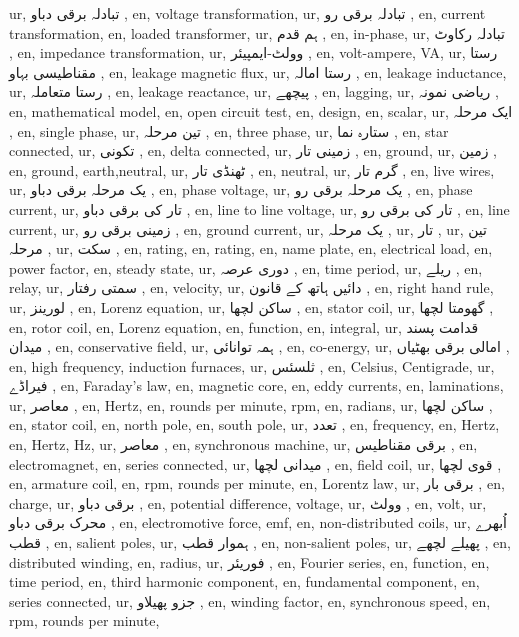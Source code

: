 ur, تبادلہ برقی دباو ,
en, voltage transformation,
ur, تبادلہ برقی رو ,
en, current transformation,
en, loaded transformer,
ur, ہم قدم ,
en, in-phase,
ur, تبادلہ رکاوٹ ,
en, impedance transformation,
ur, وولٹ-ایمپیئر ,
en, volt-ampere, VA,
ur, رستا مقناطیسی بہاو ,
en, leakage magnetic flux,
ur, رستا امالہ ,
en, leakage inductance,
ur, رستا متعاملہ ,
en, leakage reactance,
ur, پیچھے ,
en, lagging,
ur, ریاضی نمونہ ,
en, mathematical model,
en, open circuit test,
en, design,
en, scalar,
ur, ایک مرحلہ ,
en, single phase,
ur, تین مرحلہ ,
en, three phase,
ur, ستارہ نما ,
en, star connected,
ur, تکونی ,
en, delta connected,
ur, زمینی تار ,
en, ground,
ur, زمین ,
en, ground, earth,neutral,
ur, ٹھنڈی تار ,
en, neutral,
ur, گرم تار ,
en, live wires,
ur, یک مرحلہ برقی دباو ,
en, phase voltage,
ur, یک مرحلہ برقی رو ,
en, phase current,
ur, تار کی برقی دباو ,
en, line to line voltage,
ur, تار کی برقی رو ,
en, line current,
ur, زمینی برقی رو ,
en, ground current,
ur, یک مرحلہ ,
ur, تار ,
ur, تین مرحلہ ,
ur, سکت ,
en, rating,
en, rating,
en, name plate,
en, electrical load,
en, power factor,
en, steady state,
ur, دوری عرصہ ,
en, time period,
ur, ریلے ,
en, relay,
ur, سمتی رفتار ,
en, velocity,
ur, دائیں ہاتھ کے قانون ,
en, right hand rule,
ur, لورینز ,
en, Lorenz equation,
ur, ساکن لچھا ,
en, stator coil,
ur, گھومتا لچھا ,
en, rotor coil,
en, Lorenz equation,
en, function,
en, integral,
ur, قدامت پسند میدان ,
en, conservative field,
ur, ہمہ توانائی ,
en, co-energy,
ur, امالی برقی بھٹیاں ,
en, high frequency, induction furnaces,
ur, ثلسئس ,
en, Celsius, Centigrade,
ur, فیراڈے ,
en, Faraday's law,
en, magnetic core,
en, eddy currents,
en, laminations,
ur, معاصر ,
en, Hertz,
en, rounds per minute, rpm,
en, radians,
ur, ساکن لچھا ,
en, stator coil,
en, north pole,
en, south pole,
ur, تعدد ,
en, frequency,
en, Hertz,
en, Hertz, \si {\hertz },
ur, معاصر ,
en, synchronous machine,
ur, برقی مقناطیس ,
en, electromagnet,
en, series connected,
ur, میدانی لچھا ,
en, field coil,
ur, قوی لچھا ,
en, armature coil,
en, rpm, rounds per minute,
en, Lorentz law,
ur, برقی بار ,
en, charge,
ur, برقی دباو ,
en, potential difference, voltage,
ur, وولٹ ,
en, volt,
ur, محرک برقی دباو ,
en, electromotive force, emf,
en, non-distributed coils,
ur, اُبھرے قطب ,
en, salient poles,
ur, ہموار قطب ,
en, non-salient poles,
ur, پھیلے لچھے ,
en, distributed winding,
en, radius,
ur, فوریئر ,
en, Fourier series,
en, function,
en, time period,
en, third harmonic component,
en, fundamental component,
en, series connected,
ur, جزو پھیلاو ,
en, winding factor,
en, synchronous speed,
en, rpm, rounds per minute,
